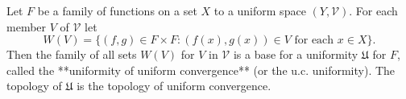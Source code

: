 Let $F$ be a family of functions on a set $X$ to a uniform space $(Y, \mathcal{V})$. For each member $V$ of $\mathcal{V}$ let
$$W(V) = \{(f, g) \in F \times F : (f(x), g(x)) \in V \text{ for each } x \in X\}.$$
Then the family of all sets $W(V)$ for $V$ in $\mathcal{V}$ is a base for a uniformity $\mathfrak{U}$ for $F$, called the **uniformity of uniform convergence** (or the u.c. uniformity). The topology of $\mathfrak{U}$ is the topology of uniform convergence.
